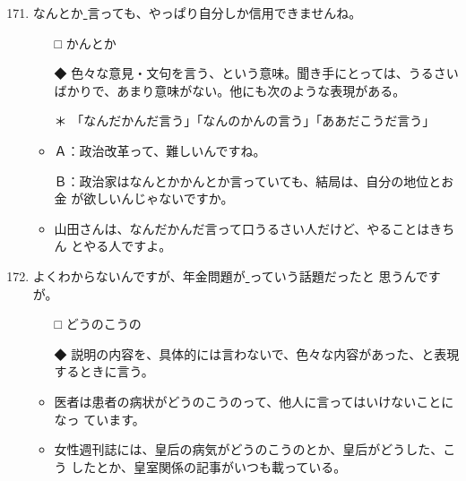 \documentclass[
uplatex,
b5paper,
10pt,
dvipdfmx
]{jsbook}
\begin{document}
\begin{enumerate}
\setcounter{enumi}{170}

\item なんとか\underline{    }言っても、やっぱり自分しか信用できませんね。
\begin{itemize}
\item[□] かんとか
\item[◆] 色々な意見・文句を言う、という意味。聞き手にとっては、うるさい
	  ばかりで、あまり意味がない。他にも次のような表現がある。
\end{itemize}
\begin{itemize}
\item[＊] 「なんだかんだ言う」「なんのかんの言う」「ああだこうだ言う」
\item Ａ：政治改革って、難しいんですね。

      Ｂ：政治家はなんとかかんとか言っていても、結局は、自分の地位とお金
      が欲しいんじゃないですか。

\item 山田さんは、なんだかんだ言って口うるさい人だけど、やることはきちん
      とやる人ですよ。
\end{itemize}

\item よくわからないんですが、年金問題が\underline{    }っていう話題だったと
      思うんですが。
\begin{itemize}
\item[□] どうのこうの
\item[◆] 説明の内容を、具体的には言わないで、色々な内容があった、と表現
	  するときに言う。
\end{itemize}
\begin{itemize}
\item 医者は患者の病状がどうのこうのって、他人に言ってはいけないことになっ
      ています。
\item 女性週刊誌には、皇后の病気がどうのこうのとか、皇后がどうした、こう
      したとか、皇室関係の記事がいつも載っている。
\end{itemize}


\end{enumerate}
\end{document}
